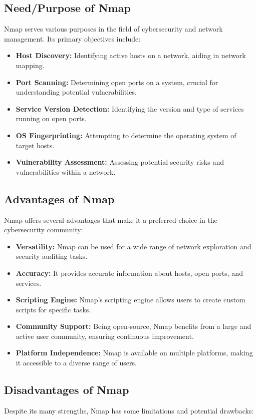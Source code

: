 \documentclass[11pt]{article}
\begin{document}
\subsection{Need/Purpose of Nmap}
Nmap serves various purposes in the field of cybersecurity and network management. Its primary objectives include:

\begin{itemize}
    \item \textbf{Host Discovery:} Identifying active hosts on a network, aiding in network mapping.
    \item \textbf{Port Scanning:} Determining open ports on a system, crucial for understanding potential vulnerabilities.
    \item \textbf{Service Version Detection:} Identifying the version and type of services running on open ports.
    \item \textbf{OS Fingerprinting:} Attempting to determine the operating system of target hosts.
    \item \textbf{Vulnerability Assessment:} Assessing potential security risks and vulnerabilities within a network.
\end{itemize}

\subsection{Advantages of Nmap}
Nmap offers several advantages that make it a preferred choice in the cybersecurity community:

\begin{itemize}
    \item \textbf{Versatility:} Nmap can be used for a wide range of network exploration and security auditing tasks.
    \item \textbf{Accuracy:} It provides accurate information about hosts, open ports, and services.
    \item \textbf{Scripting Engine:} Nmap's scripting engine allows users to create custom scripts for specific tasks.
    \item \textbf{Community Support:} Being open-source, Nmap benefits from a large and active user community, ensuring continuous improvement.
    \item \textbf{Platform Independence:} Nmap is available on multiple platforms, making it accessible to a diverse range of users.
\end{itemize}

\subsection{Disadvantages of Nmap}
Despite its many strengths, Nmap has some limitations and potential drawbacks:
\end{document}
